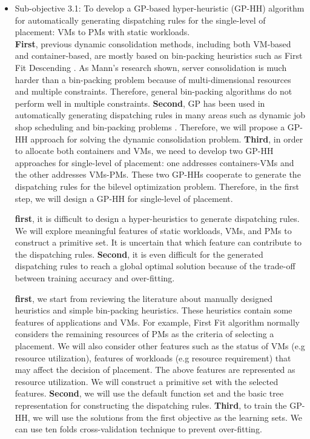 \begin{itemize}

	\item Sub-objective 3.1: To develop a GP-based hyper-heuristic (GP-HH) algorithm for automatically generating dispatching rules for the single-level of placement:  VMs to PMs with static workloads. \\

	 \textbf{First}, previous dynamic consolidation methods, including both VM-based and container-based, are mostly based on bin-packing heuristics such as First Fit Descending \cite{:2002vv}. As Mann's research \cite{Mann:2015ua} shown, server consolidation is much harder than a bin-packing problem because of multi-dimensional resources and multiple constraints. Therefore, general bin-packing algorithms do not perform well in multiple constraints. \textbf{Second}, GP has been used in automatically generating dispatching rules in many areas such as dynamic job shop scheduling \cite{Nguyen:2014eu} and bin-packing problems \cite{Burke:2006ei}. Therefore, we will propose a GP-HH approach for solving the dynamic consolidation problem. \textbf{Third}, in order to allocate both containers and VMs, we need to develop two GP-HH approaches for single-level of placement: one addresses containers-VMs and the other addresses VMs-PMs. These two GP-HHs cooperate to generate the dispatching rules for the bilevel optimization problem. Therefore, in the first step, we will design a GP-HH for single-level of placement.

	 \textbf{first}, it is difficult to design a hyper-heuristics to generate dispatching rules. We will explore meaningful features of static workloads, VMs, and PMs to construct a primitive set. It is uncertain that which feature can contribute to the dispatching rules.  \textbf{Second}, it is even difficult for the generated dispatching rules to reach a global optimal solution because of the trade-off between training accuracy and over-fitting.

	 \textbf{first}, we start from reviewing the literature about manually designed heuristics and simple bin-packing heuristics. These heuristics contain some features of applications and VMs. For example, First Fit algorithm normally considers the remaining resources of PMs as the criteria of selecting a placement. We will also consider other features such as the status of VMs (e.g resource utilization), features of workloads (e.g resource requirement) that may affect the decision of placement. The above features are represented as resource utilization. We will construct a primitive set with the selected features. 
	\textbf{Second}, we will use the default function set and the basic tree representation for constructing the dispatching rules. 
	\textbf{Third}, to train the GP-HH, we will use the solutions from the first objective as the learning sets. We can use ten folds cross-validation technique to prevent over-fitting. 


\end{itemize}
